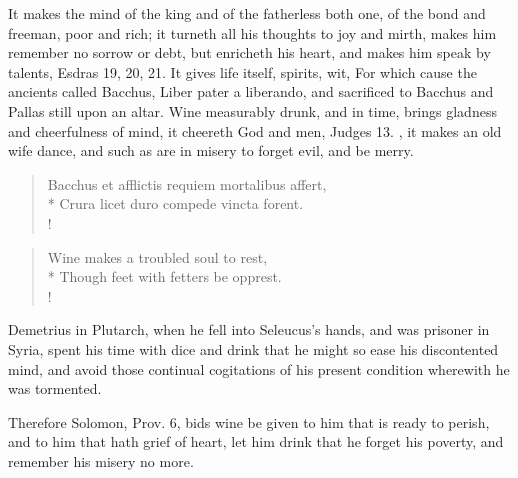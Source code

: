 It makes the mind of the king and of the fatherless both one, of the
bond and freeman, poor and rich; it turneth all his thoughts to joy and
mirth, makes him remember no sorrow or debt, but enricheth his heart,
and makes him speak by talents, Esdras  19, 20, 21. It gives life
itself, spirits, wit, \etc{} For which cause the ancients called Bacchus,
Liber pater a liberando, and sacrificed to Bacchus and Pallas
still upon an altar. Wine measurably drunk, and in time, brings
gladness and cheerfulness of mind, it cheereth God and men, Judges 
13. , it makes an old wife dance, and such as
are in misery to forget evil, and be merry.
%
\begin{latin}
\begin{verse}
Bacchus et afflictis requiem mortalibus affert,\\*
Crura licet duro compede vincta forent.\\!
\end{verse}
\end{latin}
\translationrule
\begin{verse}
Wine makes a troubled soul to rest,\\*
Though feet with fetters be opprest.\\!
\end{verse}%
%
Demetrius in Plutarch, when he fell into Seleucus's hands, and was
prisoner in Syria, spent his time with dice and drink that he
might so ease his discontented mind, and avoid those continual
cogitations of his present condition wherewith he was tormented.

Therefore Solomon, Prov.  6, bids wine be given to him that is
ready to perish, and to him that hath grief of heart, let him
drink that he forget his poverty, and remember his misery no more.

